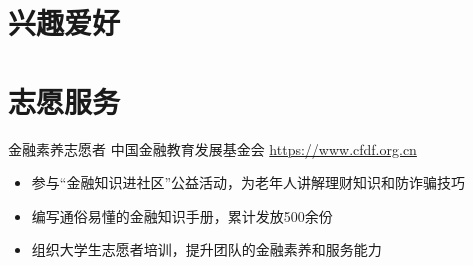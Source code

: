 \documentclass[a4paper, serif, 10pt]{moderncv}
\begin{document}
\section{兴趣爱好}

\section{志愿服务}

        {金融素养志愿者}
        {中国金融教育发展基金会}
        {\url{https://www.cfdf.org.cn}}
        {}
        {\begin{itemize}
\item 参与“金融知识进社区”公益活动，为老年人讲解理财知识和防诈骗技巧
\item 编写通俗易懂的金融知识手册，累计发放500余份
\item 组织大学生志愿者培训，提升团队的金融素养和服务能力
\end{itemize}}
    
\end{document}

